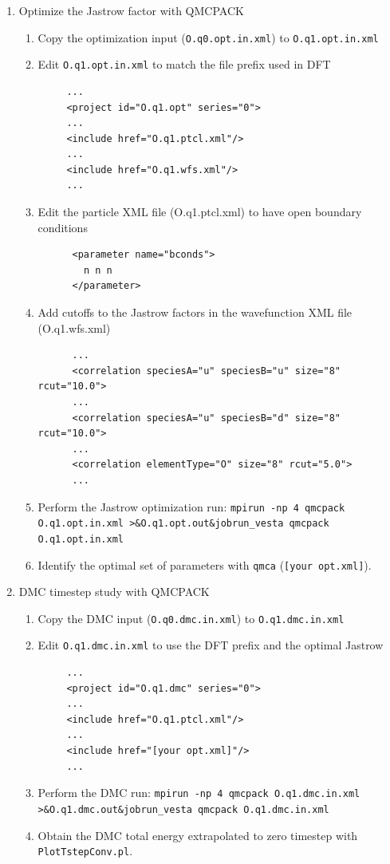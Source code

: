 \begin{enumerate}
  \item{Optimize the Jastrow factor with QMCPACK}
  \begin{enumerate}
    \item{Copy the optimization input (\texttt{O.q0.opt.in.xml}) to \texttt{O.q1.opt.in.xml}}
    \item{Edit \texttt{O.q1.opt.in.xml} to match the file prefix used in DFT}
    \begin{verbatim}
     ...
     <project id="O.q1.opt" series="0">
     ...
     <include href="O.q1.ptcl.xml"/>
     ...
     <include href="O.q1.wfs.xml"/>
     ...
    \end{verbatim}
    \item{Edit the particle XML file (O.q1.ptcl.xml) to have open boundary conditions}
    \begin{verbatim}
      <parameter name="bconds">
        n n n 
      </parameter>
    \end{verbatim}
    \item{Add cutoffs to the Jastrow factors in the wavefunction XML file (O.q1.wfs.xml)}
    \begin{verbatim}
      ...
      <correlation speciesA="u" speciesB="u" size="8" rcut="10.0">
      ...
      <correlation speciesA="u" speciesB="d" size="8" rcut="10.0">
      ...
      <correlation elementType="O" size="8" rcut="5.0">
      ...
    \end{verbatim}
    \item{Perform the Jastrow optimization run: \ifws\verb|mpirun -np 4 qmcpack O.q1.opt.in.xml >&O.q1.opt.out&|\else\verb|jobrun_vesta qmcpack O.q1.opt.in.xml|\fi}
    \item{Identify the optimal set of parameters with \texttt{qmca} (\verb|[your opt.xml]|).}
  \end{enumerate}

  \item{DMC timestep study with QMCPACK}
  \begin{enumerate}
    \item{Copy the DMC input (\texttt{O.q0.dmc.in.xml}) to \texttt{O.q1.dmc.in.xml}}
    \item{Edit \texttt{O.q1.dmc.in.xml} to use the DFT prefix and the optimal Jastrow}
    \begin{verbatim}
     ...
     <project id="O.q1.dmc" series="0">
     ...
     <include href="O.q1.ptcl.xml"/>
     ...
     <include href="[your opt.xml]"/>
     ...
    \end{verbatim}
    \item{Perform the DMC run: \ifws\verb|mpirun -np 4 qmcpack O.q1.dmc.in.xml >&O.q1.dmc.out&|\else\verb|jobrun_vesta qmcpack O.q1.dmc.in.xml|\fi}
    \item{Obtain the DMC total energy extrapolated to zero timestep with \texttt{PlotTstepConv.pl}.}
  \end{enumerate}
\end{enumerate}
